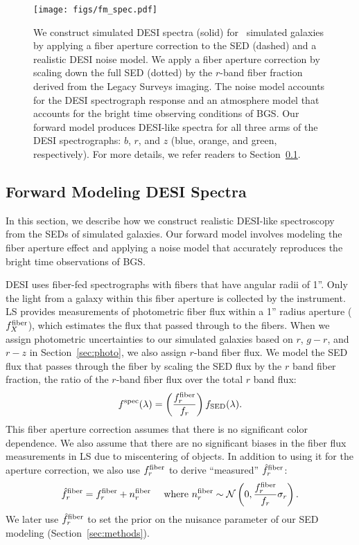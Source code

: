 \begin{figure}
\begin{center}
\texttt{[image: figs/fm\_spec.pdf]} \label{fig:spec}
\caption{
    We construct simulated DESI spectra (solid) for \lgal~simulated galaxies by
    applying a fiber aperture correction to the SED (dashed) and a realistic
    DESI noise model. 
    We apply a fiber aperture correction by scaling down the full SED (dotted)
    by the $r$-band fiber fraction derived from the Legacy Surveys imaging. 
    The noise model accounts for the DESI spectrograph response and an
    atmosphere model that accounts for the bright time observing conditions of
    BGS.
    Our forward model produces DESI-like spectra for all three arms of the DESI
    spectrographs: $b$, $r$, and $z$ (blue, orange, and green, respectively). 
    For more details, we refer readers to Section~\ref{sec:spec}.
    }
\end{center}
\end{figure}

\subsection{Forward Modeling DESI Spectra} \label{sec:spec}
In this section, we describe how we construct realistic DESI-like spectroscopy 
from the SEDs of simulated galaxies. 
Our forward model involves modeling the fiber aperture effect and applying a
noise model that accurately reproduces the bright time observations of BGS. 

DESI uses fiber-fed spectrographs with fibers that have angular radii of 1''. 
Only the light from a galaxy within this fiber aperture is collected by the 
instrument.
LS provides measurements of photometric fiber flux within a 1'' radius aperture
($f_X^{\rm fiber}$), which estimates the flux that passed through to the fibers.
When we assign photometric uncertainties to our simulated galaxies based on
$r$, $g-r$, and $r-z$ in Section~\ref{sec:photo}, we also assign $r$-band fiber
flux. 
We model the SED flux that passes through the fiber by scaling the SED flux by
the $r$ band fiber fraction, the ratio of the $r$-band fiber flux over the
total $r$ band flux: 
\begin{equation}
    f^{\rm spec}(\lambda) = \left(\frac{f_r^{\rm fiber}}{f_r}\right)f_{\rm SED}(\lambda).
\end{equation}
This fiber aperture correction assumes that there is no significant color
dependence. 
We also assume that there are no significant biases in the fiber flux
measurements in LS due to miscentering of objects. 
In addition to using it for the aperture correction, we also use $f_r^{\rm
fiber}$ to derive ``measured'' $\hat{f}_r^{\rm fiber}$: 
\begin{equation}
    \hat{f}_r^{\rm fiber} = f_r^{\rm fiber} + n^{\rm fiber}_r \quad~{\rm
    where}~n^{\rm fiber}_r \sim \mathcal{N}\left(0, \frac{f_r^{\rm fiber}}{f_r}
    \sigma_r\right).
\end{equation}
We later use $\hat{f}_r^{\rm fiber}$ to set the prior on the nuisance parameter
of our SED modeling (Section~\ref{sec:methods}).

